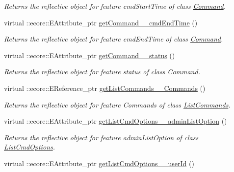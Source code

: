 \begin{DoxyCompactItemize}
\begin{DoxyCompactList}\small\item\em Returns the reflective object for feature cmdStartTime of class \hyperlink{classUMS__Data_1_1Command}{Command}. \item\end{DoxyCompactList}\item 
virtual ::ecore::EAttribute\_\-ptr \hyperlink{classUMS__Data_1_1UMS__DataPackage_a9c332c6a12546f914f960acb6164fbd7}{getCommand\_\-\_\-cmdEndTime} ()
\begin{DoxyCompactList}\small\item\em Returns the reflective object for feature cmdEndTime of class \hyperlink{classUMS__Data_1_1Command}{Command}. \item\end{DoxyCompactList}\item 
virtual ::ecore::EAttribute\_\-ptr \hyperlink{classUMS__Data_1_1UMS__DataPackage_a351aa70841ecc02c58dbec630cacb195}{getCommand\_\-\_\-status} ()
\begin{DoxyCompactList}\small\item\em Returns the reflective object for feature status of class \hyperlink{classUMS__Data_1_1Command}{Command}. \item\end{DoxyCompactList}\item 
virtual ::ecore::EReference\_\-ptr \hyperlink{classUMS__Data_1_1UMS__DataPackage_aaa723f1da5cf7e040aa47be416335d26}{getListCommands\_\-\_\-Commands} ()
\begin{DoxyCompactList}\small\item\em Returns the reflective object for feature Commands of class \hyperlink{classUMS__Data_1_1ListCommands}{ListCommands}. \item\end{DoxyCompactList}\item 
virtual ::ecore::EAttribute\_\-ptr \hyperlink{classUMS__Data_1_1UMS__DataPackage_a9d2093a7e428e695a0280c8fe032a5bc}{getListCmdOptions\_\-\_\-adminListOption} ()
\begin{DoxyCompactList}\small\item\em Returns the reflective object for feature adminListOption of class \hyperlink{classUMS__Data_1_1ListCmdOptions}{ListCmdOptions}. \item\end{DoxyCompactList}\item 
virtual ::ecore::EAttribute\_\-ptr \hyperlink{classUMS__Data_1_1UMS__DataPackage_a02b358fde9a431000328dfe65ab6cc0f}{getListCmdOptions\_\-\_\-userId} ()

\end{DoxyCompactItemize}
